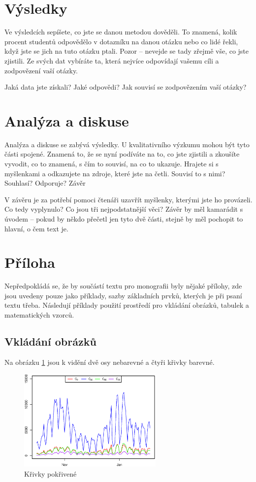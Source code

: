 \section*{Výsledky} 

Ve výsledcích sepíšete, co jste se danou metodou dověděli. To znamená, kolik procent studentů odpovědělo v dotazníku na danou otázku nebo co lidé řekli, když jste se jich na tuto otázku ptali. Pozor – nevejde se tady zřejmě vše, co jste zjistili. Ze svých dat vybíráte ta, která nejvíce odpovídají vašemu cíli a zodpovězení vaší otázky. 

    Jaká data jste získali? Jaké odpovědi? 
    Jak souvisí se zodpovězením vaší otázky? 

\section*{Analýza a diskuse} 

Analýza a diskuse se zabývá výsledky. U kvalitativního výzkumu mohou být tyto části spojené. Znamená to, že se nyní podíváte na to, co jste zjistili a zkoušíte vyvodit, co to znamená, s čím to souvisí, na co to ukazuje. Hrajete si s myšlenkami a odkazujete na zdroje, které jste na četli. Souvisí to s nimi? Souhlasí? Odporuje?  
Závěr 

V závěru je za potřebí pomoci čtenáři uzavřít myšlenky, kterými jste ho provázeli. Co tedy vyplynulo? Co jsou tři nejpodstatnější věci? Závěr by měl kamarádit s úvodem – pokud by někdo přečetl jen tyto dvě části, stejně by měl pochopit to hlavní, o čem text je. 

\section*{Příloha}
Nepředpokládá se, že by součástí textu pro monografii byly nějaké přílohy, zde jsou uvedeny pouze jako příklady, sazby základních prvků, kterých je při psaní textu třeba. Následují příklady použití prostředí pro vkládání obrázků, tabulek a matematických vzorců.

\subsection*{Vkládání obrázků}

Na obrázku \ref{fig:140-krivky_pokriv} jsou k vidění dvě osy nebarevné a čtyři křivky barevné.

\begin{figure}[ht]
    \centering
    \includegraphics[width=200pt]{./pic/140-C0-80.eps}
    \caption{Křivky pokřivené}
    \label{fig:140-krivky_pokriv}
\end{figure}


